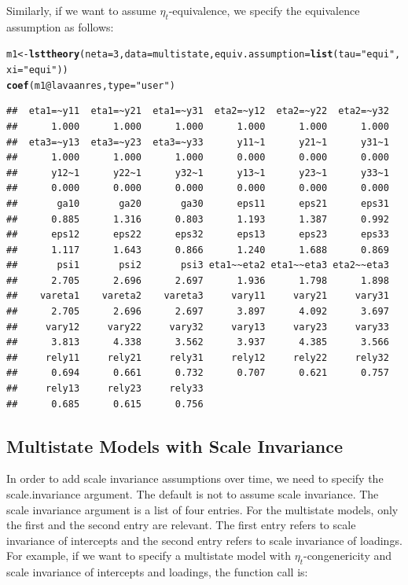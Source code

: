 \documentclass[10pt]{article}\usepackage{graphicx, color}
\makeatletter
\newcommand{\hlfunctioncall}[1]{\textcolor[rgb]{0.501960784313725,0,0.329411764705882}{\textbf{#1}}}%
\newcommand{\hlstring}[1]{\textcolor[rgb]{0.6,0.6,1}{#1}}%
\newenvironment{kframe}{%
 \def\at@end@of@kframe{}%
 \ifinner\ifhmode%
  \def\at@end@of@kframe{\end{minipage}}%
  \begin{minipage}{\columnwidth}%
 \fi\fi%
 \def\FrameCommand##1{\hskip\@totalleftmargin \hskip-\fboxsep
 \colorbox{shadecolor}{##1}\hskip-\fboxsep
     \hskip-\linewidth \hskip-\@totalleftmargin \hskip\columnwidth}%
 \MakeFramed {\advance\hsize-\width
   \@totalleftmargin\z@ \linewidth\hsize
   \@setminipage}}%
 {\par\unskip\endMakeFramed%
 \at@end@of@kframe}
\newenvironment{knitrout}{}{} %
\makeatother
\begin{document}
Similarly, if we want to assume $\eta_t$-equivalence, we specify the equivalence assumption as follows:
%
\begin{knitrout}
\color{fgcolor}\begin{kframe}
\begin{alltt}
m1 <- \hlfunctioncall{lsttheory}(neta = 3, data = multistate, equiv.assumption = \hlfunctioncall{list}(tau = \hlstring{"equi"}, 
    xi = \hlstring{"equi"}))
\hlfunctioncall{coef}(m1@lavaanres, type = \hlstring{"user"})
\end{alltt}
\begin{verbatim}
##  eta1=~y11  eta1=~y21  eta1=~y31  eta2=~y12  eta2=~y22  eta2=~y32 
##      1.000      1.000      1.000      1.000      1.000      1.000 
##  eta3=~y13  eta3=~y23  eta3=~y33      y11~1      y21~1      y31~1 
##      1.000      1.000      1.000      0.000      0.000      0.000 
##      y12~1      y22~1      y32~1      y13~1      y23~1      y33~1 
##      0.000      0.000      0.000      0.000      0.000      0.000 
##       ga10       ga20       ga30      eps11      eps21      eps31 
##      0.885      1.316      0.803      1.193      1.387      0.992 
##      eps12      eps22      eps32      eps13      eps23      eps33 
##      1.117      1.643      0.866      1.240      1.688      0.869 
##       psi1       psi2       psi3 eta1~~eta2 eta1~~eta3 eta2~~eta3 
##      2.705      2.696      2.697      1.936      1.798      1.898 
##    vareta1    vareta2    vareta3     vary11     vary21     vary31 
##      2.705      2.696      2.697      3.897      4.092      3.697 
##     vary12     vary22     vary32     vary13     vary23     vary33 
##      3.813      4.338      3.562      3.937      4.385      3.566 
##     rely11     rely21     rely31     rely12     rely22     rely32 
##      0.694      0.661      0.732      0.707      0.621      0.757 
##     rely13     rely23     rely33 
##      0.685      0.615      0.756
\end{verbatim}
\end{kframe}
\end{knitrout}

%



\subsection{Multistate Models with Scale Invariance}

In order to add scale invariance assumptions over time, we need to specify the scale.invariance argument. The default is not to assume scale invariance. The scale invariance argument is a list of four entries. For the multistate models, only the first and the second entry are relevant. The first entry refers to scale invariance of intercepts and the second entry refers to scale invariance of loadings. For example, if we want to specify a multistate model with $\eta_t$-congenericity and scale invariance of intercepts and loadings, the function call is:
\end{document}
